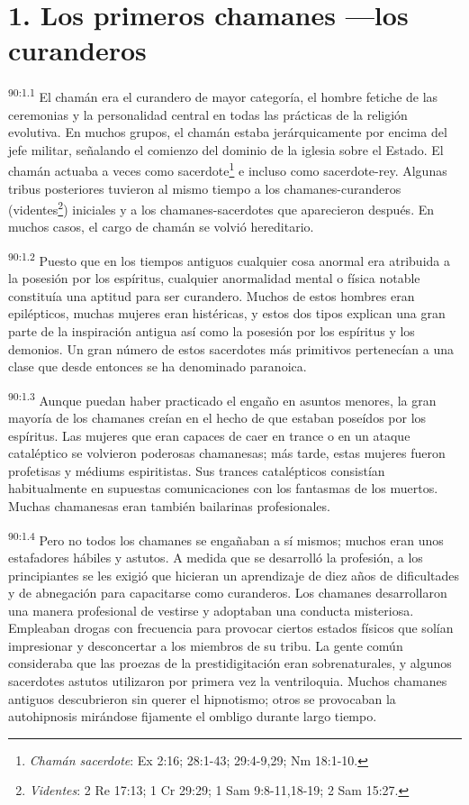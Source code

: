 \section*{1. Los primeros chamanes ---los curanderos}
\par
\textsuperscript{90:1.1} El chamán era el curandero de mayor categoría, el hombre fetiche de las ceremonias y la personalidad central en todas las prácticas de la religión evolutiva. En muchos grupos, el chamán estaba jerárquicamente por encima del jefe militar, señalando el comienzo del dominio de la iglesia sobre el Estado. El chamán actuaba a veces como sacerdote\footnote{\textit{Chamán sacerdote}: Ex 2:16; 28:1-43; 29:4-9,29; Nm 18:1-10.} e incluso como sacerdote-rey. Algunas tribus posteriores tuvieron al mismo tiempo a los chamanes-curanderos (videntes\footnote{\textit{Videntes}: 2 Re 17:13; 1 Cr 29:29; 1 Sam 9:8-11,18-19; 2 Sam 15:27.}) iniciales y a los chamanes-sacerdotes que aparecieron después. En muchos casos, el cargo de chamán se volvió hereditario.

\par
\textsuperscript{90:1.2} Puesto que en los tiempos antiguos cualquier cosa anormal era atribuida a la posesión por los espíritus, cualquier anormalidad mental o física notable constituía una aptitud para ser curandero. Muchos de estos hombres eran epilépticos, muchas mujeres eran histéricas, y estos dos tipos explican una gran parte de la inspiración antigua así como la posesión por los espíritus y los demonios. Un gran número de estos sacerdotes más primitivos pertenecían a una clase que desde entonces se ha denominado paranoica.

\par
\textsuperscript{90:1.3} Aunque puedan haber practicado el engaño en asuntos menores, la gran mayoría de los chamanes creían en el hecho de que estaban poseídos por los espíritus. Las mujeres que eran capaces de caer en trance o en un ataque cataléptico se volvieron poderosas chamanesas; más tarde, estas mujeres fueron profetisas y médiums espiritistas. Sus trances catalépticos consistían habitualmente en supuestas comunicaciones con los fantasmas de los muertos. Muchas chamanesas eran también bailarinas profesionales.

\par
\textsuperscript{90:1.4} Pero no todos los chamanes se engañaban a sí mismos; muchos eran unos estafadores hábiles y astutos. A medida que se desarrolló la profesión, a los principiantes se les exigió que hicieran un aprendizaje de diez años de dificultades y de abnegación para capacitarse como curanderos. Los chamanes desarrollaron una manera profesional de vestirse y adoptaban una conducta misteriosa. Empleaban drogas con frecuencia para provocar ciertos estados físicos que solían impresionar y desconcertar a los miembros de su tribu. La gente común consideraba que las proezas de la prestidigitación eran sobrenaturales, y algunos sacerdotes astutos utilizaron por primera vez la ventriloquia. Muchos chamanes antiguos descubrieron sin querer el hipnotismo; otros se provocaban la autohipnosis mirándose fijamente el ombligo durante largo tiempo.

